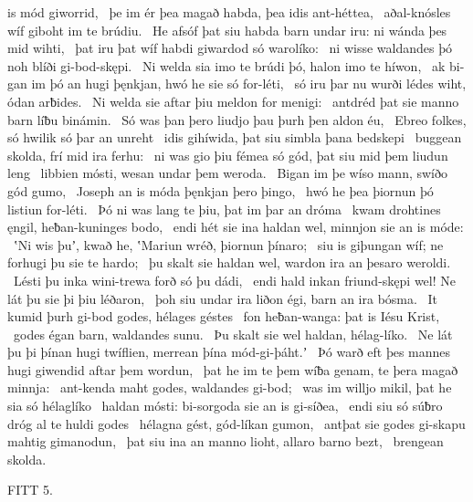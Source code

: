 is mód giworrid, \hld\ þe im ér þea magað habda,
þea idis ant-héttea, \hld\ aðal-knósles wíf
giboht im te brúdiu. \hld\ He afsóf þat siu habda barn undar iru:
ni wánda þes mid wihti, \hld\ þat iru þat wíf habdi
giwardod só warolíko: \hld\ ni wisse waldandes þó noh
blíði gi-bod-skępi. \hld\ Ni welda sia imo te brúdi þó,
halon imo te híwon, \hld\ ak bi-gan im þó an hugi þęnkjan,
hwó he sie só for-léti, \hld\ só iru þar nu wurði lédes wiht,
ódan arƀides. \hld\ Ni welda sie aftar þiu
meldon for menigi: \hld\ antdréd þat sie manno barn
líƀu binámin. \hld\ Só was þan þero liudjo þau
þurh þen aldon éu, \hld\ Ebreo folkes,
só hwilik só þar an unreht \hld\ idis gihíwida,
þat siu simbla þana bedskepi \hld\ buggean skolda,
frí mid ira ferhu: \hld\ ni was gio þiu fémea só gód,
þat siu mid þem liudun leng \hld\ libbien mósti,
wesan undar þem weroda. \hld\ Bigan im þe wíso mann,
swíðo gód gumo, \hld\ Joseph an is móda
þęnkjan þero þingo, \hld\ hwó he þea þiornun þó
listiun for-léti. \hld\ Þó ni was lang te þiu,
þat im þar an dróma \hld\ kwam drohtines ęngil,
heƀan-kuninges bodo, \hld\ endi hét sie ina haldan wel,
minnjon sie an is móde: \hld\ ʽNi wis þuʼ, kwað he, ʽMariun wréð,
þiornun þínaro; \hld\ siu is giþungan wíf;
ne forhugi þu sie te hardo; \hld\ þu skalt sie haldan wel,
wardon ira an þesaro weroldi. \hld\ Lésti þu inka wini-trewa
forð só þu dádi, \hld\ endi hald inkan friund-skępi wel!
Ne lát þu sie þi þiu léðaron, \hld\ þoh siu undar ira liðon égi,
barn an ira bósma. \hld\ It kumid þurh gi-bod godes,
hélages géstes \hld\ fon heƀan-wanga:
þat is Iésu Krist, \hld\ godes égan barn,
waldandes sunu. \hld\ Þu skalt sie wel haldan,
hélag-líko. \hld\ Ne lát þu þi þínan hugi twíflien,
merrean þína mód-gi-þáht.ʼ \hld\ Þó warð eft þes mannes hugi
giwendid aftar þem wordun, \hld\ þat he im te þem wíƀa genam,
te þera magað minnja: \hld\ ant-kenda maht godes,
waldandes gi-bod; \hld\ was im willjo mikil,
þat he sia só hélaglíko \hld\ haldan mósti:
bi-sorgoda sie an is gi-síðea, \hld\ endi siu só súƀro dróg
al te huldi godes \hld\ hélagna gést,
gód-líkan gumon, \hld\ antþat sie godes gi-skapu
mahtig gimanodun, \hld\ þat siu ina an manno lioht,
allaro barno bezt, \hld\ brengean skolda.

FITT 5.

